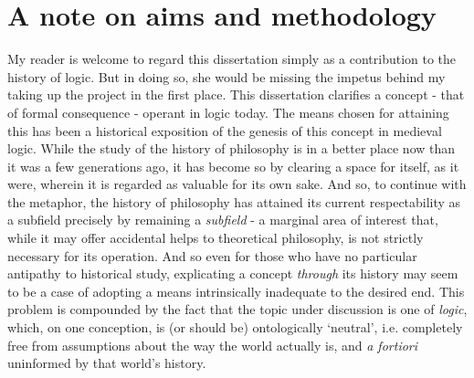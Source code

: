\documentclass[]{article}
\title{}
\author{}
\begin{document}
\maketitle

\begin{abstract}

\end{abstract}

\section{A note on aims and methodology}
My reader is welcome to regard this dissertation simply as a contribution to the history of logic. But in doing so, she would be missing the impetus behind my taking up the project in the first place. This dissertation clarifies a concept - that of formal consequence - operant in logic today. The means chosen for attaining this has been a historical exposition of the genesis of this concept in medieval logic. While the study of the history of philosophy is in a better place now than it was a few generations ago, it has become so by clearing a space for itself, as it were, wherein it is regarded as valuable for its own sake. And so, to continue with the metaphor, the history of philosophy has attained its current respectability as a subfield precisely by remaining a \textit{subfield} - a marginal area of interest that, while it may offer accidental helps to theoretical philosophy, is not strictly necessary for its operation. And so even for those who have no particular antipathy to historical study, explicating a concept \textit{through} its history may seem to be a case of adopting a means intrinsically inadequate to the desired end. This problem is compounded by the fact that the topic under discussion is one of \textit{logic}, which, on one conception, is (or should be) ontologically `neutral', i.e. completely free from assumptions about the way the world actually is, and \textit{a fortiori} uninformed by that world's history.
\end{document}
